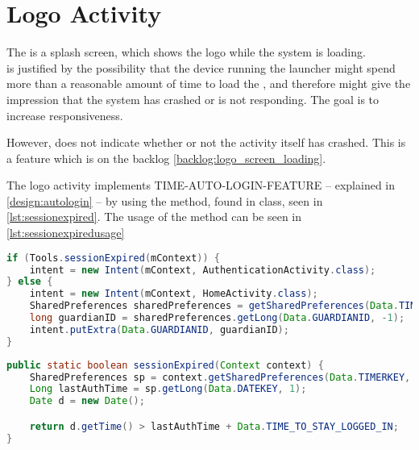 \section{Logo Activity}
The  is a splash screen, which shows the \giraf[] logo while the system is loading. \\
 is justified by the possibility that the device running the launcher might spend more than a reasonable amount of time to load the , and therefore might give the impression that the system has crashed or is not responding. The goal is to increase responsiveness.

However,  does not indicate whether or not the activity itself has crashed. This is a feature which is on the backlog \autoref{backlog:logo_screen_loading}.

The logo activity implements TIME-AUTO-LOGIN-FEATURE -- explained in \autoref{design:autologin} -- by using the  method, found in  class, seen in \autoref{lst:sessionexpired}.
The usage of the  method can be seen in \autoref{lst:sessionexpiredusage}

\begin{lstlisting}[style=sourceCode, language=JAVA, caption=Snippet of: LogoActivity.java, label=lst:sessionexpiredusage] 
if (Tools.sessionExpired(mContext)) {
	intent = new Intent(mContext, AuthenticationActivity.class);
} else {
	intent = new Intent(mContext, HomeActivity.class);
	SharedPreferences sharedPreferences = getSharedPreferences(Data.TIMERKEY, 0);
	long guardianID = sharedPreferences.getLong(Data.GUARDIANID, -1);
	intent.putExtra(Data.GUARDIANID, guardianID);
}

\end{lstlisting}


\begin{lstlisting}[style=sourceCode, language=JAVA, caption=Snippet of: Tools.java, label=lst:sessionexpired]
public static boolean sessionExpired(Context context) {
	SharedPreferences sp = context.getSharedPreferences(Data.TIMERKEY, 0);
	Long lastAuthTime = sp.getLong(Data.DATEKEY, 1);
	Date d = new Date();

	return d.getTime() > lastAuthTime + Data.TIME_TO_STAY_LOGGED_IN;
}
	\end{lstlisting}
